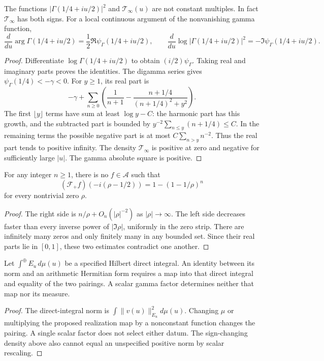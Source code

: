 \begin{proposition}
\label{v4-arith:w5-a:prop:archimedean-not-absorbed}
The functions $|\Gamma(1/4+iu/2)|^2$ and $\mathcal T_\infty(u)$
are not constant multiples. In fact $\mathcal T_\infty$ has both signs.
For a local continuous argument of the nonvanishing gamma function,
\[
 \frac{d}{du}\arg\Gamma(1/4+iu/2)=\frac12\Re\psi_\Gamma(1/4+iu/2),
 \qquad
 \frac{d}{du}\log|\Gamma(1/4+iu/2)|^2=-\Im\psi_\Gamma(1/4+iu/2).
\]
\end{proposition}
\begin{proof}
Differentiate $\log\Gamma(1/4+iu/2)$ to obtain $(i/2)\psi_\Gamma$.
Taking real and imaginary parts proves the identities.
The digamma series gives $\psi_\Gamma(1/4)<-\gamma<0$.
For $y\ge1$, its real part is
\[
 -\gamma+\sum_{n\ge0}
 \left(\frac1{n+1}-\frac{n+1/4}{(n+1/4)^2+y^2}\right).
\]
The first $\lfloor y\rfloor$ terms have sum at least $\log y-C$:
the harmonic part has this growth, and the subtracted part is bounded
by $y^{-2}\sum_{n\le y}(n+1/4)\le C$.
In the remaining terms the possible negative part is at most
$C\sum_{n>y}n^{-2}$. Thus the real part tends to positive infinity.
The density $\mathcal T_\infty$ is positive at zero and negative
for sufficiently large $|u|$. The gamma absolute square is positive.
\end{proof}

\begin{proposition}
\label{v4-arith:w5-a:prop:li-via-weil}
For any integer $n\ge1$, there is no $f\in\mathscr A$ such that
\[
 (\mathcal F_+f)(-i(\rho-1/2))=1-(1-1/\rho)^n
\]
for every nontrivial zero $\rho$.
\end{proposition}
\begin{proof}
The right side is $n/\rho+O_n(|\rho|^{-2})$ as $|\rho|\to\infty$.
The left side decreases faster than every inverse power of
$|\Im\rho|$, uniformly in the zero strip. There are infinitely many
zeros and only finitely many in any bounded set. Since their real
parts lie in $[0,1]$, these two estimates contradict one another.
\end{proof}

\begin{proposition}
\label{v4-arith:w5-a:prop:eisenstein-residual}
Let $\int^\oplus E_u\,d\mu(u)$ be a specified Hilbert direct integral.
An identity between its norm and an arithmetic Hermitian form requires
a map into that direct integral and equality of the two pairings.
A scalar gamma factor determines neither that map nor its measure.
\end{proposition}
\begin{proof}
The direct-integral norm is $\int\|v(u)\|_{E_u}^2d\mu(u)$.
Changing $\mu$ or multiplying the proposed realization map by a
nonconstant function changes the pairing. A single scalar factor
does not select either datum. The sign-changing density above also
cannot equal an unspecified positive norm by scalar rescaling.
\end{proof}

